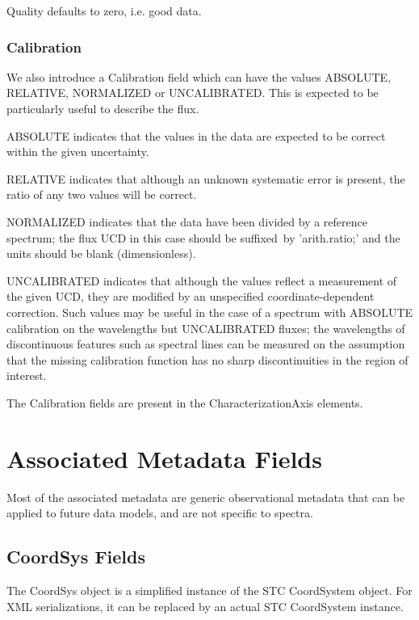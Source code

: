 \documentclass[11pt]{article}
\newcommand{\nchange}[1]{{\color{ired} #1}}
\begin{document}
Quality defaults to zero, i.e. good data.

\subsubsection{Calibration}

{We also introduce a Calibration field which can have
the values ABSOLUTE, RELATIVE, NORMALIZED or UNCALIBRATED. This is expected
to be particularly useful to describe the flux. 


ABSOLUTE indicates
that the values in the data are expected to be correct within the
given uncertainty. 

RELATIVE indicates that although an unknown
systematic error is present, the ratio of any two values will be
correct. 

NORMALIZED indicates that the data have been divided by a reference
spectrum; the flux UCD in this case should be {\nchange suffixed}~by 'arith.ratio;' and
the units should be blank (dimensionless).

UNCALIBRATED indicates that although the values reflect a
measurement of the given UCD, they are modified by an unspecified
coordinate-dependent correction. Such values may be useful in the
case of a spectrum with ABSOLUTE calibration on the wavelengths
but UNCALIBRATED fluxes; the wavelengths of discontinuous features 
such as spectral lines can be
measured on the assumption that the missing calibration function
has no sharp discontinuities in the region of interest.
}

The Calibration fields are present in the CharacterizationAxis elements.



\clearpage

\section{Associated Metadata Fields}

Most of the associated metadata are generic observational
metadata that can be applied to future data models, and are
not specific to spectra.

\subsection{CoordSys Fields}

The CoordSys object is a simplified instance of the STC CoordSystem object.
For XML serializations, it can be replaced by an actual STC CoordSystem
instance.
\end{document}

